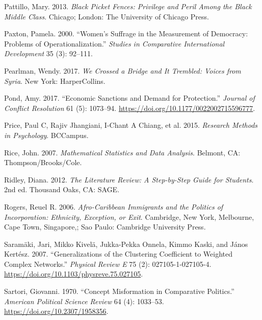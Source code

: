 \documentclass{book}
\newlength{\cslhangindent}
\newlength{\cslentryspacingunit} %
\newenvironment{CSLReferences}[2] %
 {%
  \setlength{\parindent}{0pt}
  \ifodd #1
  \let\oldpar\par
  \def\par{\hangindent=\cslhangindent\oldpar}
  \fi
  \setlength{\parskip}{#2\cslentryspacingunit}
 }%
 {}
\begin{document}
\begin{CSLReferences}{1}{0}
\leavevmode{}%
Pattillo, Mary. 2013. \emph{Black Picket Fences: Privilege and Peril Among the
Black Middle Class}. Chicago; London: The University of Chicago Press.

\leavevmode{}%
Paxton, Pamela. 2000. {``Women's {Suffrage} in the {Measurement} of
{Democracy}: {Problems} of {Operationalization}.''} \emph{Studies in
Comparative International Development} 35 (3): 92--111.

\leavevmode{}%
Pearlman, Wendy. 2017. \emph{We {Crossed} a {Bridge} and {It Trembled}:
{Voices} from {Syria}}. {New York}: {HarperCollins}.

\leavevmode{}%
Pond, Amy. 2017. {``Economic Sanctions and Demand for Protection.''}
\emph{Journal of Conflict Resolution} 61 (5): 1073--94.
\url{https://doi.org/10.1177/0022002715596777}.

\leavevmode{}%
Price, Paul C, Rajiv Jhangiani, I-Chant A Chiang, et al. 2015. \emph{Research
Methods in Psychology}. BCCampus.

\leavevmode{}%
Rice, John. 2007. \emph{Mathematical Statistics and Data Analysis}. Belmont,
CA: Thompson/Brooks/Cole.

\leavevmode{}%
Ridley, Diana. 2012. \emph{The {Literature Review}: {A Step}-by-{Step Guide}
for {Students}}. 2nd ed. Thousand Oaks, CA: {SAGE}.

\leavevmode{}%
Rogers, Reuel R. 2006. \emph{Afro-Caribbean Immigrants and the Politics of
Incorporation: Ethnicity, Exception, or Exit}. Cambridge, New York, Melbourne,
Cape Town, Singapore,; Sao Paulo: Cambridge University Press.

\leavevmode{}%
Saramäki, Jari, Mikko Kivelä, Jukka-Pekka Onnela, Kimmo Kaski, and János
Kertész. 2007. {``Generalizations of the Clustering Coefficient to Weighted
Complex Networks.''} \emph{Physical Review E} 75 (2): 027105-1-027105-4.
\url{https://doi.org/10.1103/physreve.75.027105}.

\leavevmode{}%
Sartori, Giovanni. 1970. {``Concept {Misformation} in {Comparative
Politics}.''} \emph{American Political Science Review} 64 (4): 1033--53.
\url{https://doi.org/10.2307/1958356}.


\end{CSLReferences}
\end{document}
